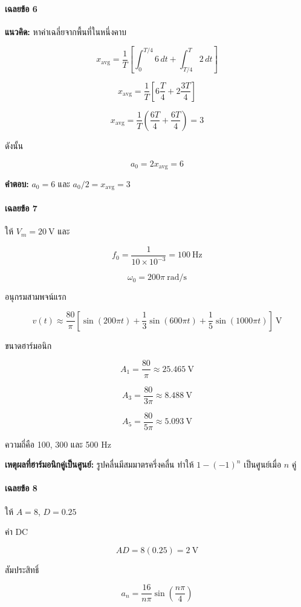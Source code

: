 \paragraph{เฉลยข้อ 6}

\textbf{แนวคิด:} หาค่าเฉลี่ยจากพื้นที่ในหนึ่งคาบ

\[
x_{\mathrm{avg}}=\frac{1}{T}\left[
\int_0^{T/4}6\,dt+\int_{T/4}^{T}2\,dt
\right]
\]

\[
x_{\mathrm{avg}}=\frac{1}{T}\left[6\frac{T}{4}+2\frac{3T}{4}\right]
\]

\[
x_{\mathrm{avg}}=\frac{1}{T}\left(\frac{6T}{4}+\frac{6T}{4}\right)=3
\]

ดังนั้น

\[
a_0=2x_{\mathrm{avg}}=6
\]

\textbf{คำตอบ:} \(a_0=6\) และ \(a_0/2=x_{\mathrm{avg}}=3\)

\paragraph{เฉลยข้อ 7}

ให้ \(V_m=20\ \text{V}\) และ

\[
f_0=\frac{1}{10\times10^{-3}}=100\ \text{Hz}
\]

\[
\omega_0=200\pi\ \text{rad/s}
\]

อนุกรมสามพจน์แรก

\[
v(t)\approx\frac{80}{\pi}\left[
\sin(200\pi t)+\frac{1}{3}\sin(600\pi t)+\frac{1}{5}\sin(1000\pi t)
\right]\ \text{V}
\]

ขนาดฮาร์มอนิก

\[
A_1=\frac{80}{\pi}\approx25.465\ \text{V}
\]

\[
A_3=\frac{80}{3\pi}\approx8.488\ \text{V}
\]

\[
A_5=\frac{80}{5\pi}\approx5.093\ \text{V}
\]

ความถี่คือ 100, 300 และ 500 Hz

\textbf{เหตุผลที่ฮาร์มอนิกคู่เป็นศูนย์:} รูปคลื่นมีสมมาตรครึ่งคลื่น ทำให้ \(1-(-1)^n\) เป็นศูนย์เมื่อ \(n\) คู่

\paragraph{เฉลยข้อ 8}

ให้ \(A=8\), \(D=0.25\)

ค่า DC

\[
AD=8(0.25)=2\ \text{V}
\]

สัมประสิทธิ์

\[
a_n=\frac{16}{n\pi}\sin\left(\frac{n\pi}{4}\right)
\]

